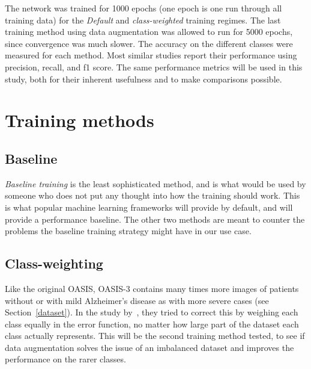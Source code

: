 \documentclass{kththesis}
\newcommand{\num}[1]{{#1}}
\begin{document}
The network was trained for \num{1000} epochs (one epoch is one run through all training data) for the \textit{Default} and \textit{class-weighted} training regimes. The last training method using data augmentation was allowed to run for \num{5000} epochs, since convergence was much slower. The accuracy on the different classes were measured for each method. Most similar studies report their performance using precision, recall, and f1 score. The same performance metrics will be used in this study, both for their inherent usefulness and to make comparisons possible.

\section{Training methods}
\subsection{Baseline}
\textit{Baseline training} is the least sophisticated method, and is what would be used by someone who does not put any thought into how the training should work. This is what popular machine learning frameworks will provide by default, and will provide a performance baseline. The other two methods are meant to counter the problems the baseline training strategy might have in our use case.

\subsection{Class-weighting}
Like the original OASIS, OASIS-3 contains many times more images of patients without or with mild Alzheimer's disease as with more severe cases (see Section~\ref{dataset}). In the study by~\textcite{islam2017novel}, they tried to correct this by weighing each class equally in the error function, no matter how large part of the dataset each class actually represents. This will be the second training method tested, to see if data augmentation solves the issue of an imbalanced dataset and improves the performance on the rarer classes.
\end{document}
